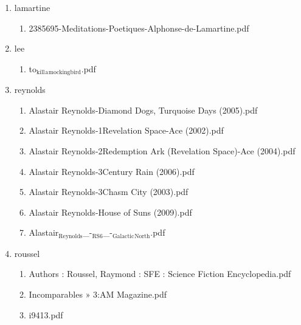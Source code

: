 \documentclass[11pt]{article}
\begin{document}
\begin{enumerate}
\item lamartine
\label{sec-1-1-1-1-28-22}
\begin{enumerate}
\item 2385695-Meditations-Poetiques-Alphonse-de-Lamartine.pdf
\label{sec-1-1-1-1-28-22-1}
\end{enumerate}

\item lee
\label{sec-1-1-1-1-28-23}
\begin{enumerate}
\item to$_{\text{kill}}$$_{\text{a}}$$_{\text{mockingbird}}$.pdf
\label{sec-1-1-1-1-28-23-1}
\end{enumerate}

\item reynolds
\label{sec-1-1-1-1-28-24}
\begin{enumerate}
\item Alastair  Reynolds-Diamond Dogs, Turquoise Days (2005).pdf
\label{sec-1-1-1-1-28-24-1}

\item Alastair Reynolds-1Revelation Space-Ace (2002).pdf
\label{sec-1-1-1-1-28-24-2}

\item Alastair Reynolds-2Redemption Ark (Revelation Space)-Ace (2004).pdf
\label{sec-1-1-1-1-28-24-3}

\item Alastair Reynolds-3Century Rain (2006).pdf
\label{sec-1-1-1-1-28-24-4}

\item Alastair Reynolds-3Chasm City (2003).pdf
\label{sec-1-1-1-1-28-24-5}

\item Alastair Reynolds-House of Suns (2009).pdf
\label{sec-1-1-1-1-28-24-6}

\item Alastair$_{\text{Reynolds}}$\_-$_{\text{RS6}}$\_-$_{\text{Galactic}}$$_{\text{North}}$.pdf
\label{sec-1-1-1-1-28-24-7}
\end{enumerate}

\item roussel
\label{sec-1-1-1-1-28-25}
\begin{enumerate}
\item Authors : Roussel, Raymond : SFE : Science Fiction Encyclopedia.pdf
\label{sec-1-1-1-1-28-25-1}

\item Incomparables » 3:AM Magazine.pdf
\label{sec-1-1-1-1-28-25-2}

\item i9413.pdf
\label{sec-1-1-1-1-28-25-3}
\end{enumerate}


\end{enumerate}
\end{document}
